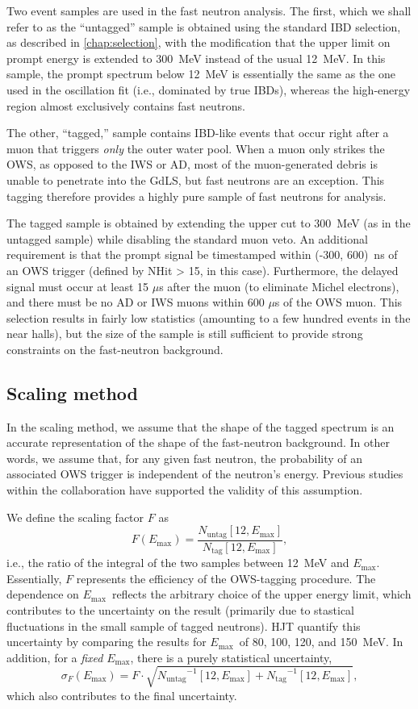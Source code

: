 \documentclass[../thesis.tex]{subfiles}
\begin{document}
Two event samples are used in the fast neutron analysis. The first, which we shall refer to as the ``untagged'' sample is obtained using the standard IBD selection, as described in \autoref{chap:selection}, with the modification that the upper limit on prompt energy is extended to 300~MeV instead of the usual 12~MeV. In this sample, the prompt spectrum below 12~MeV is essentially the same as the one used in the oscillation fit (i.e., dominated by true IBDs), whereas the high-energy region almost exclusively contains fast neutrons.

The other, ``tagged,'' sample contains IBD-like events that occur right after a muon that triggers \emph{only} the outer water pool. When a muon only strikes the OWS, as opposed to the IWS or AD, most of the muon-generated debris is unable to penetrate into the GdLS, but fast neutrons are an exception. This tagging therefore provides a highly pure sample of fast neutrons for analysis.

The tagged sample is obtained by extending the upper cut to 300~MeV (as in the untagged sample) while disabling the standard muon veto. An additional requirement is that the prompt signal be timestamped within (-300, 600)~ns of an OWS trigger (defined by NHit > 15, in this case). Furthermore, the delayed signal must occur at least 15 $\mu$s after the muon (to eliminate Michel electrons), and there must be no AD or IWS muons within 600 $\mu$s of the OWS muon. This selection results in fairly low statistics (amounting to a few hundred events in the near halls), but the size of the sample is still sufficient to provide strong constraints on the fast-neutron background.

\subsection{Scaling method}
\label{sec:fastn_scaling}

In the scaling method, we assume that the shape of the tagged spectrum is an accurate representation of the shape of the fast-neutron background. In other words, we assume that, for any given fast neutron, the probability of an associated OWS trigger is independent of the neutron's energy. Previous studies within the collaboration have supported the validity of this assumption.

\def\emax{\ensuremath{E_\mathrm{max}}} \def\ntag{\ensuremath{N_\mathrm{tag}}}
\def\nuntag{\ensuremath{N_\mathrm{untag}}}

We define the scaling factor $F$ as \[ F(\emax) = \frac{\nuntag[12, \emax]}{\ntag[12, \emax]}, \] i.e., the ratio of the integral of the two samples between 12~MeV and \emax. Essentially, $F$ represents the efficiency of the OWS-tagging procedure. The dependence on \emax\ reflects the arbitrary choice of the upper energy limit, which contributes to the uncertainty on the result (primarily due to stastical fluctuations in the small sample of tagged neutrons). HJT quantify this uncertainty by comparing the results for \emax\ of 80, 100, 120, and 150~MeV. In addition, for a \emph{fixed} \emax, there is a purely statistical uncertainty,
\[ \sigma_F(\emax) = F \cdot \sqrt{\nuntag^{-1}[12, \emax] + \ntag^{-1}[12,
    \emax]},
\]
which also contributes to the final uncertainty.
\end{document}
